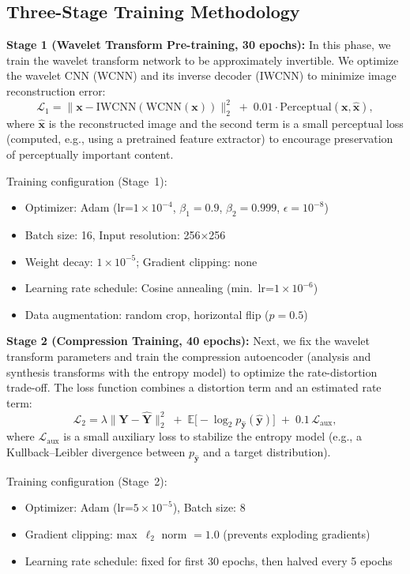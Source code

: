 \documentclass[conference]{IEEEtran}
\begin{document}
\subsection{Three-Stage Training Methodology}

\textbf{Stage 1 (Wavelet Transform Pre-training, 30 epochs):} In this phase, we train the wavelet transform network to be approximately invertible. We optimize the wavelet CNN (WCNN) and its inverse decoder (IWCNN) to minimize image reconstruction error:
\begin{equation}
\mathcal{L}_1 = \|\mathbf{x} - \text{IWCNN}(\text{WCNN}(\mathbf{x}))\|_2^2 \;+\; 0.01 \cdot \text{Perceptual}(\mathbf{x}, \hat{\mathbf{x}}),
\end{equation}
where $\hat{\mathbf{x}}$ is the reconstructed image and the second term is a small perceptual loss (computed, e.g., using a pretrained feature extractor) to encourage preservation of perceptually important content.

Training configuration (Stage~1):
\begin{itemize}
\item Optimizer: Adam (lr=$1\times 10^{-4}$, $\beta_1=0.9$, $\beta_2=0.999$, $\epsilon=10^{-8}$)
\item Batch size: 16, Input resolution: 256×256
\item Weight decay: $1\times 10^{-5}$; Gradient clipping: none
\item Learning rate schedule: Cosine annealing (min.~lr=$1\times 10^{-6}$)
\item Data augmentation: random crop, horizontal flip ($p=0.5$)
\end{itemize}

\textbf{Stage 2 (Compression Training, 40 epochs):} Next, we fix the wavelet transform parameters and train the compression autoencoder (analysis and synthesis transforms with the entropy model) to optimize the rate-distortion trade-off. The loss function combines a distortion term and an estimated rate term:
\begin{equation}
\mathcal{L}_2 = \lambda \|\mathbf{Y} - \hat{\mathbf{Y}}\|_2^2 \;+\; \mathbb{E}\big[-\log_2 p_{\hat{\mathbf{y}}}(\hat{\mathbf{y}})\big] \;+\; 0.1\,\mathcal{L}_{\text{aux}},
\end{equation}
where $\mathcal{L}_{\text{aux}}$ is a small auxiliary loss to stabilize the entropy model (e.g., a Kullback–Leibler divergence between $p_{\hat{\mathbf{y}}}$ and a target distribution).

Training configuration (Stage~2):
\begin{itemize}
\item Optimizer: Adam (lr=$5\times 10^{-5}$), Batch size: 8
\item Gradient clipping: max~$\ell_2$ norm $=1.0$ (prevents exploding gradients)
\item Learning rate schedule: fixed for first 30 epochs, then halved every 5 epochs
\end{itemize}
\end{document}

